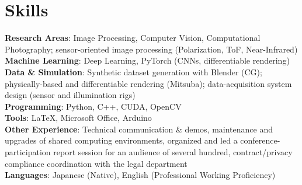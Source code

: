 \documentclass[a4paper,11pt]{article}
\begin{document}
\section{Skills}
 \begin{itemize}[leftmargin=0.5cm, label={}]
    \small{\item{
     \textbf{Research Areas}{: Image Processing, Computer Vision, Computational Photography; sensor-oriented image processing (Polarization, ToF, Near-Infrared)} \\[3pt]
     \textbf{Machine Learning}{: Deep Learning, PyTorch (CNNs, differentiable rendering)} \\[3pt]
     \textbf{Data \& Simulation}{: Synthetic dataset generation with Blender (CG); physically-based and differentiable rendering (Mitsuba); data-acquisition system design (sensor and illumination rigs)} \\[3pt]
     \textbf{Programming}{: Python, C++, CUDA, OpenCV} \\[3pt]
     \textbf{Tools}{: LaTeX, Microsoft Office, Arduino} \\[3pt]
     \textbf{Other Experience}{: Technical communication \& demos, maintenance and upgrades of shared computing environments, organized and led a conference-participation report session for an audience of several hundred, contract/privacy compliance coordination with the legal department} \\[3pt]
     \textbf{Languages}{: Japanese (Native), English (Professional Working Proficiency)}
    }}
 \end{itemize}

\end{document}
